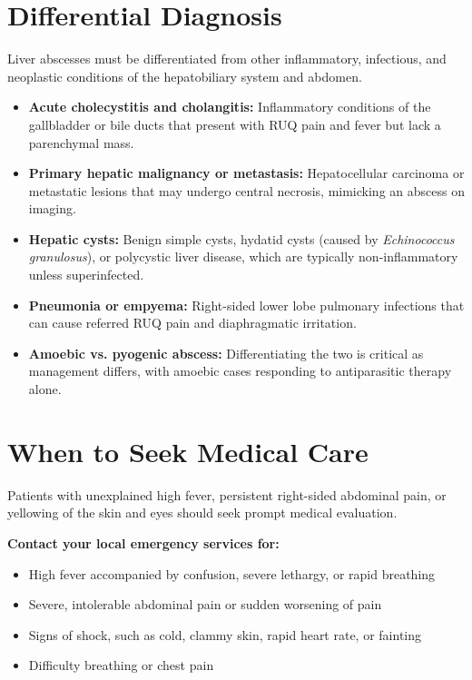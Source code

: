 \section*{Differential Diagnosis}
Liver abscesses must be differentiated from other inflammatory, infectious, and neoplastic conditions of the hepatobiliary system and abdomen.
\begin{itemize}
    \item \textbf{Acute cholecystitis and cholangitis:} Inflammatory conditions of the gallbladder or bile ducts that present with RUQ pain and fever but lack a parenchymal mass.
    \item \textbf{Primary hepatic malignancy or metastasis:} Hepatocellular carcinoma or metastatic lesions that may undergo central necrosis, mimicking an abscess on imaging.
    \item \textbf{Hepatic cysts:} Benign simple cysts, hydatid cysts (caused by \textit{Echinococcus granulosus}), or polycystic liver disease, which are typically non-inflammatory unless superinfected.
    \item \textbf{Pneumonia or empyema:} Right-sided lower lobe pulmonary infections that can cause referred RUQ pain and diaphragmatic irritation.
    \item \textbf{Amoebic vs. pyogenic abscess:} Differentiating the two is critical as management differs, with amoebic cases responding to antiparasitic therapy alone.
\end{itemize}

\section*{When to Seek Medical Care}
Patients with unexplained high fever, persistent right-sided abdominal pain, or yellowing of the skin and eyes should seek prompt medical evaluation.

\textbf{Contact your local emergency services for:}
\begin{itemize}
    \item High fever accompanied by confusion, severe lethargy, or rapid breathing
    \item Severe, intolerable abdominal pain or sudden worsening of pain
    \item Signs of shock, such as cold, clammy skin, rapid heart rate, or fainting
    \item Difficulty breathing or chest pain
\end{itemize}

